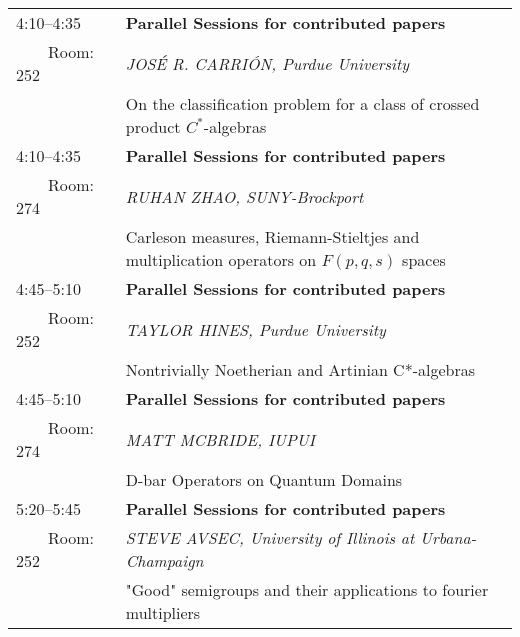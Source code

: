 \documentclass[10pt]{article}                                  %
\newcommand{\cinfo}[2]{{\raggedright{\hspace*{.2truein}\em#1}}\\ &{\raggedright{\hspace*{.2truein}\hspace*{.2truein}#2}}\\[1ex]}
\newcommand{\CONTP}{{\raggedright{\bf Parallel Sessions for contributed papers}}\\}
\newcommand{\rmB}{\ \ \ \ Room: 252&}
\newcommand{\rmC}{\ \ \ \ Room: 274&}
\begin{document}
{ \begin{tabular}{lp{5.3in}}

4:10--4:35&\CONTP \rmB\cinfo{            
JOS\'E R. CARRI\'ON, Purdue University  }{On the classification problem for a class of crossed product $C^*$-algebras
}

4:10--4:35&\CONTP \rmC\cinfo{RUHAN ZHAO, SUNY-Brockport}
 {Carleson measures, Riemann-Stieltjes and multiplication operators on $F(p,q,s)$ spaces}


4:45--5:10&\CONTP \rmB\cinfo{TAYLOR HINES,  Purdue University }{
Nontrivially Noetherian and Artinian C*-algebras}

4:45--5:10&\CONTP \rmC\cinfo{MATT MCBRIDE, IUPUI }
 {D-bar Operators on Quantum Domains}


5:20--5:45&\CONTP \rmB\cinfo{STEVE AVSEC, University of Illinois at Urbana-Champaign }{"Good" semigroups and their applications to fourier multipliers}

 

\end{tabular}

}
\end{document}
